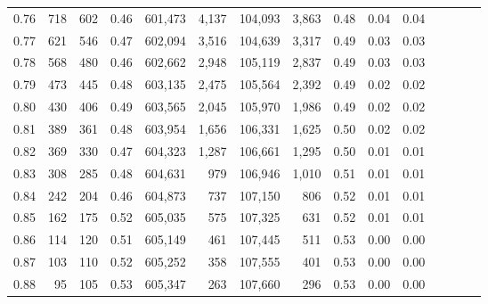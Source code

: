 \begin{tabular}{rrrcrrrrrrrrrrr}
0.76 &     718 &    602 &                                       0.46 &  601,473 &    4,137 &  104,093 &    3,863 &  0.48 &  0.04 &                         0.04 \\
0.77 &     621 &    546 &                                       0.47 &  602,094 &    3,516 &  104,639 &    3,317 &  0.49 &  0.03 &                         0.03 \\
0.78 &     568 &    480 &                                       0.46 &  602,662 &    2,948 &  105,119 &    2,837 &  0.49 &  0.03 &                         0.03 \\
0.79 &     473 &    445 &                                       0.48 &  603,135 &    2,475 &  105,564 &    2,392 &  0.49 &  0.02 &                         0.02 \\
0.80 &     430 &    406 &                                       0.49 &  603,565 &    2,045 &  105,970 &    1,986 &  0.49 &  0.02 &                         0.02 \\
0.81 &     389 &    361 &                                       0.48 &  603,954 &    1,656 &  106,331 &    1,625 &  0.50 &  0.02 &                         0.02 \\
0.82 &     369 &    330 &                                       0.47 &  604,323 &    1,287 &  106,661 &    1,295 &  0.50 &  0.01 &                         0.01 \\
0.83 &     308 &    285 &                                       0.48 &  604,631 &      979 &  106,946 &    1,010 &  0.51 &  0.01 &                         0.01 \\
0.84 &     242 &    204 &                                       0.46 &  604,873 &      737 &  107,150 &      806 &  0.52 &  0.01 &                         0.01 \\
0.85 &     162 &    175 &                                       0.52 &  605,035 &      575 &  107,325 &      631 &  0.52 &  0.01 &                         0.01 \\
0.86 &     114 &    120 &                                       0.51 &  605,149 &      461 &  107,445 &      511 &  0.53 &  0.00 &                         0.00 \\
0.87 &     103 &    110 &                                       0.52 &  605,252 &      358 &  107,555 &      401 &  0.53 &  0.00 &                         0.00 \\
0.88 &      95 &    105 &                                       0.53 &  605,347 &      263 &  107,660 &      296 &  0.53 &  0.00 &                         0.00 \\

\end{tabular}
